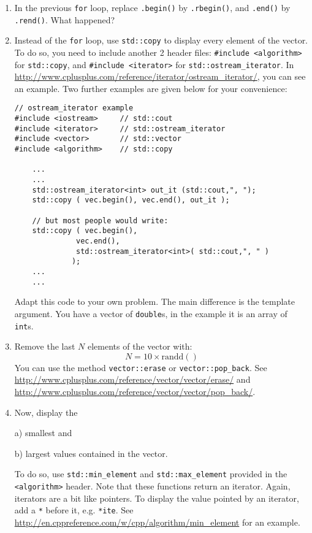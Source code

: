 \begin{enumerate}

\item In the previous \verb+for+ loop, replace \verb+.begin()+ by \verb+.rbegin()+, and \verb+.end()+ by \verb+.rend()+. What happened?

\item Instead of the \verb+for+ loop, use \verb+std::copy+ to display every element of the vector. To do so, you need to include another 2 header files:
\verb+#include <algorithm>+ for \verb+std::copy+, and \verb+#include <iterator>+ for \verb+std::ostream_iterator+. 
In \url{http://www.cplusplus.com/reference/iterator/ostream_iterator/}, you can see an example. 
Two further examples are given below for your convenience:
\begin{lstlisting}
// ostream_iterator example
#include <iostream>     // std::cout
#include <iterator>     // std::ostream_iterator
#include <vector>       // std::vector
#include <algorithm>    // std::copy

    ...
    ...
    std::ostream_iterator<int> out_it (std::cout,", ");
    std::copy ( vec.begin(), vec.end(), out_it );
  
    // but most people would write:
    std::copy ( vec.begin(), 
              vec.end(), 
              std::ostream_iterator<int>( std::cout,", " )
             );
    ...
    ...
\end{lstlisting}
Adapt this code to your own problem. The main difference is the template argument. 
You have a vector of \verb+double+s, in the example it is an array of \verb+int+s.

\item Remove the last $N$ elements of the vector with:
$$
	N = 10 \times \mathrm{randd()}
$$
You can use the method \verb+vector::erase+ or \verb+vector::pop_back+. 
See \url{http://www.cplusplus.com/reference/vector/vector/erase/} and \url{http://www.cplusplus.com/reference/vector/vector/pop_back/}.

\item Now, display the 

a) smallest and 

b) largest values contained in the vector. 

To do so, use \verb+std::min_element+ and \verb+std::max_element+ provided in the \verb+<algorithm>+ header. Note that these functions return an iterator. Again, iterators are a bit like pointers. To display the value pointed by an iterator, add a \verb+*+ before it, e.g. \verb+*ite+.
See \url{http://en.cppreference.com/w/cpp/algorithm/min_element} for an example.


\end{enumerate}

